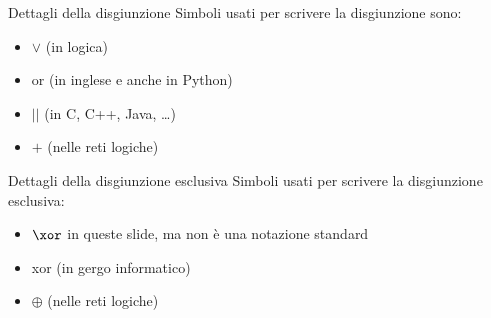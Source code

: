 \documentclass[10pt,dvipsnames,handout]{beamer}
\begin{document}
\begin{frame}{Dettagli della disgiunzione}
    Simboli usati per scrivere la disgiunzione sono:
    \begin{itemize}
        \item \alert{$\vee$ (in logica)}
        \item or (in inglese e anche in Python)
        \item $\texttt{||}$ (in C, C++, Java, \ldots)
        \item $+$ (nelle reti logiche)
    \end{itemize}

\end{frame}

\begin{frame}{Dettagli della disgiunzione esclusiva}
    Simboli usati per scrivere la disgiunzione esclusiva:
    \begin{itemize}
        \item \alert{$\xor$ in queste slide}, ma non è una notazione standard
        \item xor (in gergo informatico)
        \item $\oplus$ (nelle reti logiche)
    \end{itemize}

\end{frame}
\end{document}

